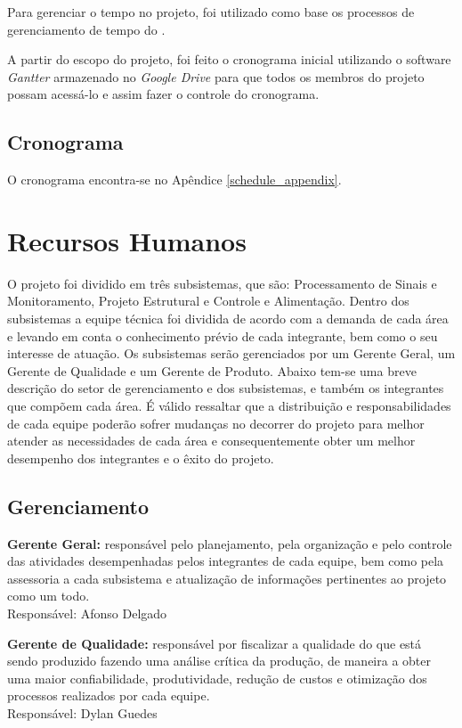 Para gerenciar o tempo no projeto, foi utilizado como base os processos
de gerenciamento de tempo do \cite{pmbok2012}.

A partir do escopo do projeto, foi feito o cronograma inicial utilizando o software \textit{Gantter} armazenado no \textit{Google Drive} para que todos os membros do projeto
possam acessá-lo e assim fazer o controle do cronograma.

\subsection{Cronograma}

O cronograma encontra-se no Apêndice \ref{schedule_appendix}.

\section{Recursos Humanos}

O projeto foi dividido em três subsistemas, que são: Processamento de Sinais e Monitoramento,
Projeto Estrutural e Controle e Alimentação. Dentro dos subsistemas a equipe
técnica foi dividida de acordo com a demanda de cada área e levando em conta o
conhecimento prévio de cada integrante, bem como o seu interesse de atuação. Os
subsistemas serão gerenciados por um Gerente Geral, um Gerente de Qualidade e
um Gerente de Produto.
Abaixo tem-se uma breve descrição do setor de gerenciamento e dos subsistemas,
e também os integrantes que compõem cada área. É válido ressaltar que a
distribuição e responsabilidades de cada equipe poderão sofrer mudanças no
decorrer do projeto para melhor atender as necessidades de cada área e
consequentemente obter um melhor desempenho dos integrantes e o êxito do projeto.

\subsection{Gerenciamento}

\textbf{Gerente Geral:} responsável pelo planejamento, pela organização e pelo controle das atividades desempenhadas pelos integrantes de cada equipe, bem como pela assessoria a cada subsistema e atualização de informações pertinentes ao projeto como um todo.
\\Responsável: Afonso Delgado

\textbf{Gerente de Qualidade:} responsável por fiscalizar a qualidade do que está sendo produzido fazendo uma análise crítica da produção, de maneira a obter uma maior confiabilidade, produtividade, redução de custos e otimização dos processos realizados por cada equipe.
\\Responsável: Dylan Guedes

